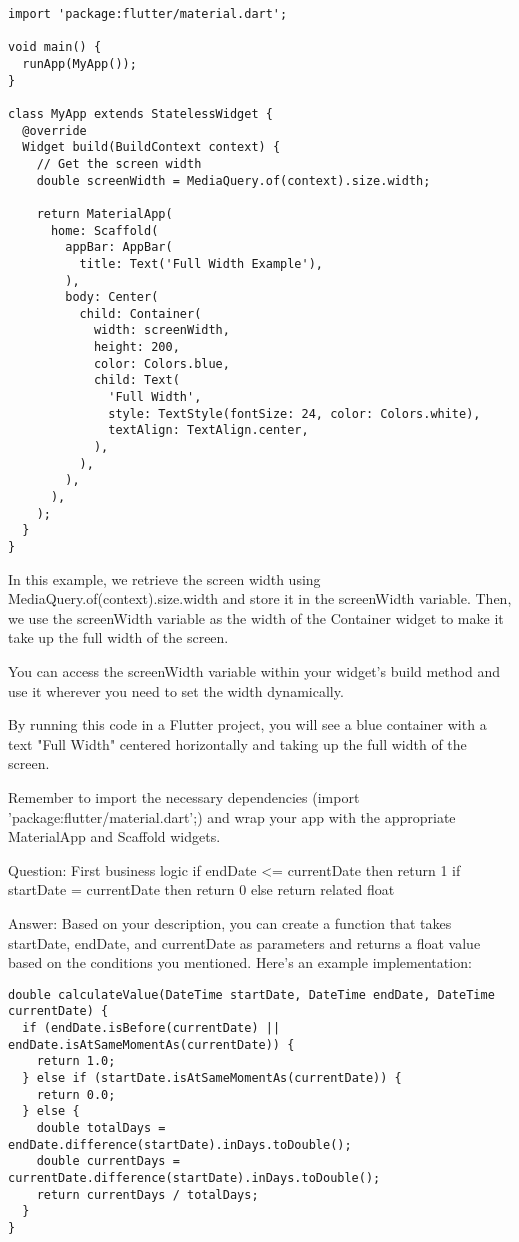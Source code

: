 \begin{lstlisting}
import 'package:flutter/material.dart';

void main() {
  runApp(MyApp());
}

class MyApp extends StatelessWidget {
  @override
  Widget build(BuildContext context) {
    // Get the screen width
    double screenWidth = MediaQuery.of(context).size.width;

    return MaterialApp(
      home: Scaffold(
        appBar: AppBar(
          title: Text('Full Width Example'),
        ),
        body: Center(
          child: Container(
            width: screenWidth,
            height: 200,
            color: Colors.blue,
            child: Text(
              'Full Width',
              style: TextStyle(fontSize: 24, color: Colors.white),
              textAlign: TextAlign.center,
            ),
          ),
        ),
      ),
    );
  }
}
\end{lstlisting}

In this example, we retrieve the screen width using MediaQuery.of(context).size.width and store it in the screenWidth 
variable. Then, we use the screenWidth variable as the width of the Container widget to make it take up the full 
width of the screen.

You can access the screenWidth variable within your widget's build method and use it wherever you need to set 
the width dynamically.

By running this code in a Flutter project, you will see a blue container with a text "Full Width" centered 
horizontally and taking up the full width of the screen.

Remember to import the necessary dependencies (import 'package:flutter/material.dart';) and wrap your app with 
the appropriate MaterialApp and Scaffold widgets.


Question: First business logic
if endDate <= currentDate then return 1
if startDate = currentDate then return 0
else return related float

Answer: Based on your description, you can create a function that takes startDate, endDate, and currentDate as 
parameters and returns a float value based on the conditions you mentioned. Here's an example implementation:

\begin{lstlisting}
double calculateValue(DateTime startDate, DateTime endDate, DateTime currentDate) {
  if (endDate.isBefore(currentDate) || endDate.isAtSameMomentAs(currentDate)) {
    return 1.0;
  } else if (startDate.isAtSameMomentAs(currentDate)) {
    return 0.0;
  } else {
    double totalDays = endDate.difference(startDate).inDays.toDouble();
    double currentDays = currentDate.difference(startDate).inDays.toDouble();
    return currentDays / totalDays;
  }
}
\end{lstlisting}

